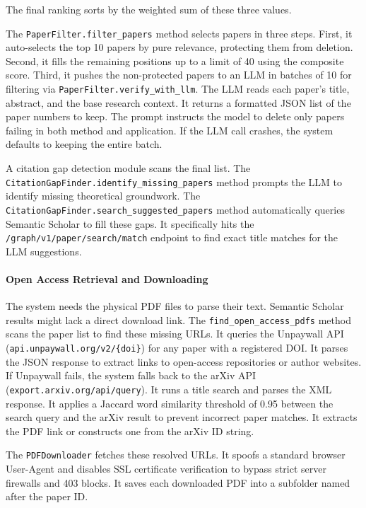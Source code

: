 The final ranking sorts by the weighted sum of these three values.

The \texttt{PaperFilter.filter\_papers} method selects papers in three steps.
First, it auto-selects the top 10 papers by pure relevance, protecting them from deletion.
Second, it fills the remaining positions up to a limit of 40 using the composite score.
Third, it pushes the non-protected papers to an LLM in batches of 10 for filtering via \texttt{PaperFilter.\allowbreak{}verify\_\allowbreak{}with\_\allowbreak{}llm}.
The LLM reads each paper's title, abstract, and the base research context.
It returns a formatted JSON list of the paper numbers to keep.
The prompt instructs the model to delete only papers failing in both method and application.
If the LLM call crashes, the system defaults to keeping the entire batch.

A citation gap detection module scans the final list.
The \texttt{CitationGapFinder.\allowbreak{}identify\_\allowbreak{}missing\_\allowbreak{}papers} method prompts the LLM to identify missing theoretical groundwork.
The \texttt{CitationGapFinder.\allowbreak{}search\_\allowbreak{}suggested\_\allowbreak{}papers} method automatically queries Semantic Scholar to fill these gaps.
It specifically hits the \texttt{/graph/v1/paper/search/match} endpoint to find exact title matches for the LLM suggestions.

\paragraph{Open Access Retrieval and Downloading}
The system needs the physical PDF files to parse their text.
Semantic Scholar results might lack a direct download link.
The \texttt{find\_\allowbreak{}open\_\allowbreak{}access\_\allowbreak{}pdfs} method scans the paper list to find these missing URLs.
It queries the Unpaywall API (\texttt{api.unpaywall.org/v2/\{doi\}}) for any paper with a registered DOI.
It parses the JSON response to extract links to open-access repositories or author websites.
If Unpaywall fails, the system falls back to the arXiv API (\texttt{export.arxiv.org/api/query}).
It runs a title search and parses the XML response.
It applies a Jaccard word similarity threshold of 0.95 between the search query and the arXiv result to prevent incorrect paper matches.
It extracts the PDF link or constructs one from the arXiv ID string.

The \texttt{PDFDownloader} fetches these resolved URLs.
It spoofs a standard browser User-Agent and disables SSL certificate verification to bypass strict server firewalls and 403 blocks.
It saves each downloaded PDF into a subfolder named after the paper ID.




